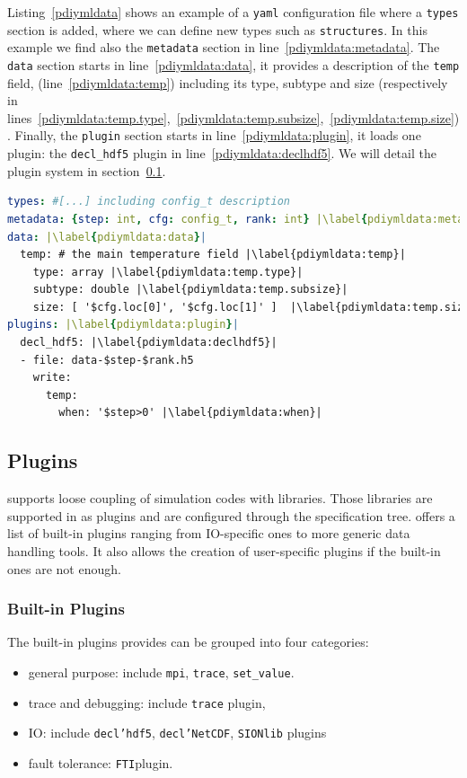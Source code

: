 Listing~\ref{pdiymldata} shows an example of a \pdi \texttt{yaml} configuration file where a \texttt{types} section is added, where we can define new types such as \texttt{structures}. In this example we find also the \texttt{metadata} section in line~\ref{pdiymldata:metadata}. The \texttt{data} section starts in line~\ref{pdiymldata:data}, it provides a description of the \texttt{temp} field, (line~\ref{pdiymldata:temp}) including its type, subtype and size (respectively in lines~\ref{pdiymldata:temp.type},~\ref{pdiymldata:temp.subsize},~\ref{pdiymldata:temp.size}). 
Finally, the \texttt{plugin} section starts in line~\ref{pdiymldata:plugin}, it loads one plugin: the \texttt{decl\_hdf5} plugin in line~\ref{pdiymldata:declhdf5}. We will detail the \pdi plugin system in section~\ref{plugins}.

\begin{lstlisting}[float, label=pdiymldata, language=yaml, caption=Data description in \pdi YAML file]
types: #[...] including config_t description
metadata: {step: int, cfg: config_t, rank: int} |\label{pdiymldata:metadata}|
data: |\label{pdiymldata:data}|
  temp: # the main temperature field |\label{pdiymldata:temp}|
    type: array |\label{pdiymldata:temp.type}|
    subtype: double |\label{pdiymldata:temp.subsize}|
    size: [ '$cfg.loc[0]', '$cfg.loc[1]' ]  |\label{pdiymldata:temp.size}|
plugins: |\label{pdiymldata:plugin}|
  decl_hdf5: |\label{pdiymldata:declhdf5}|
  - file: data-$step-$rank.h5 
    write:
      temp:
        when: '$step>0' |\label{pdiymldata:when}|
\end{lstlisting}

\subsection{\pdi Plugins}\label{plugins}
\pdi supports loose coupling of simulation codes with libraries. Those libraries are supported in \pdi as plugins and are configured through the specification tree. \pdi offers a list of built-in plugins ranging from IO-specific ones to more generic data handling tools. It also allows the creation of user-specific plugins if the built-in ones are not enough.     

\subsubsection{Built-in Plugins}
The built-in plugins \pdi provides can be grouped into four categories: 
\begin{itemize}
    \item general purpose: include \texttt{mpi}, \texttt{trace}, \texttt{set\_value}.  
    \item trace and debugging: include \texttt{trace} plugin,
    \item IO: include \texttt{decl’hdf5}, \texttt{decl’NetCDF}, \texttt{SIONlib} plugins
    \item fault tolerance: \texttt{FTI}plugin.
\end{itemize}

